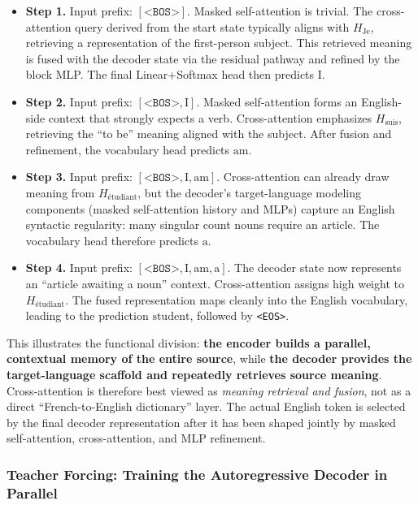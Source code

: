 \begin{itemize}
	\item \textbf{Step 1.}
	Input prefix: \([\texttt{<BOS>}]\).
	Masked self-attention is trivial.
	The cross-attention query derived from the start state typically aligns with \(H_{\text{Je}}\),
	retrieving a representation of the first-person subject.
	This retrieved meaning is fused with the decoder state via the residual pathway
	and refined by the block MLP.
	The final Linear+Softmax head then predicts
	\(\text{I}\).
	
	\item \textbf{Step 2.}
	Input prefix: \([\texttt{<BOS>}, \text{I}]\).
	Masked self-attention forms an English-side context that strongly expects a verb.
	Cross-attention emphasizes \(H_{\text{suis}}\),
	retrieving the ``to be'' meaning aligned with the subject.
	After fusion and refinement, the vocabulary head predicts
	\(\text{am}\).
	
	\item \textbf{Step 3.}
	Input prefix: \([\texttt{<BOS>}, \text{I}, \text{am}]\).
	Cross-attention can already draw meaning from \(H_{\text{\'{e}tudiant}}\),
	but the decoder’s target-language modeling components
	(masked self-attention history and MLPs)
	capture an English syntactic regularity:
	many singular count nouns require an article.
	The vocabulary head therefore predicts
	\(\text{a}\).
	
	\item \textbf{Step 4.}
	Input prefix: \([\texttt{<BOS>}, \text{I}, \text{am}, \text{a}]\).
	The decoder state now represents an ``article awaiting a noun'' context.
	Cross-attention assigns high weight to \(H_{\text{\'{e}tudiant}}\).
	The fused representation maps cleanly into the English vocabulary,
	leading to the prediction
	\(\text{student}\),
	followed by \texttt{<EOS>}.
\end{itemize}

\noindent
This illustrates the functional division:
\textbf{the encoder builds a parallel, contextual memory of the entire source},
while
\textbf{the decoder provides the target-language scaffold and repeatedly retrieves source meaning}.
Cross-attention is therefore best viewed as \emph{meaning retrieval and fusion},
not as a direct ``French-to-English dictionary'' layer.
The actual English token is selected by the final decoder representation
after it has been shaped jointly by masked self-attention, cross-attention, and MLP refinement.

\subsubsection{Teacher Forcing: Training the Autoregressive Decoder in Parallel}
\label{subsubsec:chapter17_teacher_forcing}

